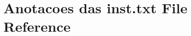 \hypertarget{Anotacoes_01das_01inst_8txt}{}\section{Anotacoes das inst.\+txt File Reference}
\label{Anotacoes_01das_01inst_8txt}

